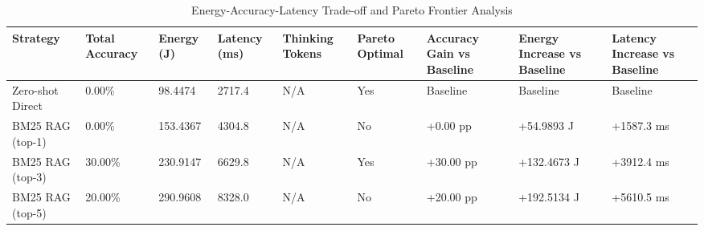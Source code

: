 \begin{table}
\caption{Energy-Accuracy-Latency Trade-off and Pareto Frontier Analysis}
\label{tab:tradeoff_comparison}
\begin{tabular}{lllllllll}
\toprule
Strategy & Total Accuracy & Energy (J) & Latency (ms) & Thinking Tokens & Pareto Optimal & Accuracy Gain vs Baseline & Energy Increase vs Baseline & Latency Increase vs Baseline \\
\midrule
Zero-shot Direct & 0.00\% & 98.4474 & 2717.4 & N/A & Yes & Baseline & Baseline & Baseline \\
BM25 RAG (top-1) & 0.00\% & 153.4367 & 4304.8 & N/A & No & +0.00 pp & +54.9893 J & +1587.3 ms \\
BM25 RAG (top-3) & 30.00\% & 230.9147 & 6629.8 & N/A & Yes & +30.00 pp & +132.4673 J & +3912.4 ms \\
BM25 RAG (top-5) & 20.00\% & 290.9608 & 8328.0 & N/A & No & +20.00 pp & +192.5134 J & +5610.5 ms \\
\bottomrule
\end{tabular}
\end{table}
